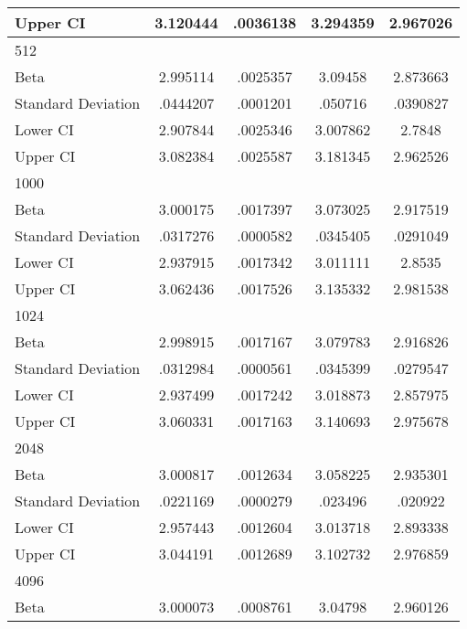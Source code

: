 {\begin{tabular}{l*{1}{cccc}}
Upper CI            &    3.120444&    .0036138&    3.294359&    2.967026\\
\hline
512                 &            &            &            &            \\
Beta                &    2.995114&    .0025357&     3.09458&    2.873663\\
Standard Deviation  &    .0444207&    .0001201&     .050716&    .0390827\\
Lower CI            &    2.907844&    .0025346&    3.007862&      2.7848\\
Upper CI            &    3.082384&    .0025587&    3.181345&    2.962526\\
\hline
1000                &            &            &            &            \\
Beta                &    3.000175&    .0017397&    3.073025&    2.917519\\
Standard Deviation  &    .0317276&    .0000582&    .0345405&    .0291049\\
Lower CI            &    2.937915&    .0017342&    3.011111&      2.8535\\
Upper CI            &    3.062436&    .0017526&    3.135332&    2.981538\\
\hline
1024                &            &            &            &            \\
Beta                &    2.998915&    .0017167&    3.079783&    2.916826\\
Standard Deviation  &    .0312984&    .0000561&    .0345399&    .0279547\\
Lower CI            &    2.937499&    .0017242&    3.018873&    2.857975\\
Upper CI            &    3.060331&    .0017163&    3.140693&    2.975678\\
\hline
2048                &            &            &            &            \\
Beta                &    3.000817&    .0012634&    3.058225&    2.935301\\
Standard Deviation  &    .0221169&    .0000279&     .023496&     .020922\\
Lower CI            &    2.957443&    .0012604&    3.013718&    2.893338\\
Upper CI            &    3.044191&    .0012689&    3.102732&    2.976859\\
\hline
4096                &            &            &            &            \\
Beta                &    3.000073&    .0008761&     3.04798&    2.960126\\

\end{tabular}}
